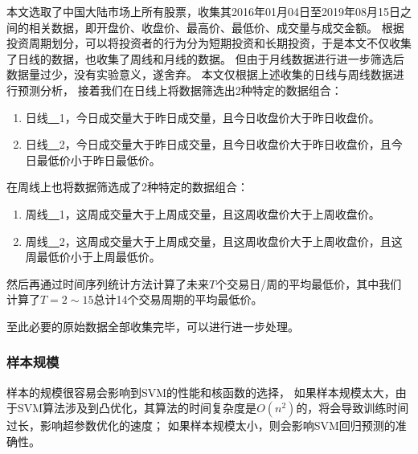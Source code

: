 本文选取了中国大陆市场上所有股票，收集其2016年01月04日至2019年08月15日之间的相关数据，即开盘价、收盘价、最高价、最低价、成交量与成交金额。
根据投资周期划分，可以将投资者的行为分为短期投资和长期投资，于是本文不仅收集了日线的数据，也收集了周线和月线的数据。
但由于月线数据进行进一步筛选后数据量过少，没有实验意义，遂舍弃。
本文仅根据上述收集的日线与周线数据进行预测分析，
接着我们在日线上将数据筛选出2种特定的数据组合：
\begin{enumerate}
    \item 日线\underline{~~}1，今日成交量大于昨日成交量，且今日收盘价大于昨日收盘价。
    \item 日线\underline{~~}2，今日成交量大于昨日成交量，且今日收盘价大于昨日收盘价，且今日最低价小于昨日最低价。
\end{enumerate}
在周线上也将数据筛选成了2种特定的数据组合：
\begin{enumerate}
    \item 周线\underline{~~}1，这周成交量大于上周成交量，且这周收盘价大于上周收盘价。
    \item 周线\underline{~~}2，这周成交量大于上周成交量，且这周收盘价大于上周收盘价，且这周最低价小于上周最低价。
\end{enumerate}
然后再通过时间序列统计方法计算了未来$T$个交易日/周的平均最低价，其中我们计算了$T=2\sim15$总计14个交易周期的平均最低价。

至此必要的原始数据全部收集完毕，可以进行进一步处理。

\subsubsection{样本规模}

样本的规模很容易会影响到SVM的性能和核函数的选择，
如果样本规模太大，由于SVM算法涉及到凸优化，其算法的时间复杂度是$O(n^2)$的，将会导致训练时间过长，影响超参数优化的速度；
如果样本规模太小，则会影响SVM回归预测的准确性。

